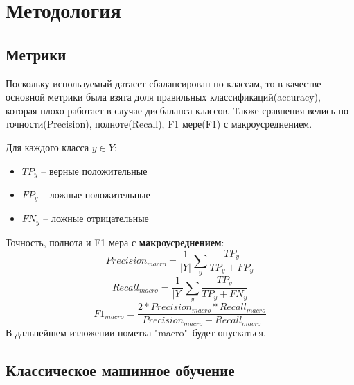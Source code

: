 \documentclass{article}
\begin{document}
\section{Методология}
\subsection{Метрики}
Поскольку используемый датасет сбалансирован по классам, то в качестве основной метрики была взята доля правильных классификаций(accuracy), которая плохо работает в случае дисбаланса классов. Также сравнения велись по точности(Precision), полноте(Recall), F1 мере(F1) с макроусреднением. 

Для каждого класса $y \in Y$:
\begin{itemize}
    \item $TP_y$ -- верные положительные
    \item $FP_y$ -- ложные положительные
    \item $FN_y$ -- ложные отрицательные
\end{itemize}
Точность, полнота и F1 мера с {\bfseries макроусреднением}:
            $$ 
                Precision_{macro} = \frac{1}{|Y|}\sum_{y}\frac{TP_y}{TP_y + FP_y}
            $$
            $$ 
                Recall_{macro} = \frac{1}{|Y|}\sum_{y}\frac{TP_y}{TP_y + FN_y}
            $$
            $$
                F1_{macro} = \frac{2 * Precision_{macro} * Recall_{macro}}
                                  {Precision_{macro} + Recall_{macro}}
            $$
В дальнейшем изложении пометка "macro"\ будет опускаться.
\subsection{Классическое машинное обучение}
\end{document}

